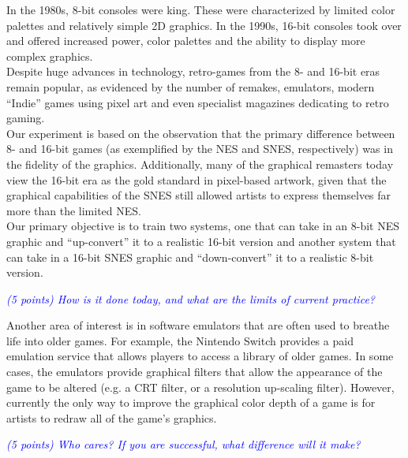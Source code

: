 \documentclass[10pt,twocolumn,letterpaper]{article}
\begin{document}
In the 1980s, 8-bit consoles were king. These were characterized by limited color palettes and relatively simple 2D graphics. In the 1990s, 16-bit consoles took over and offered increased power, color palettes and the ability to display more complex graphics.\\
Despite huge advances in technology, retro-games from the 8- and 16-bit eras remain popular, as evidenced by the number of remakes, emulators, modern ``Indie'' games using pixel art and even specialist magazines dedicating to retro gaming.\\
Our experiment is based on the observation that the primary difference between 8- and 16-bit games (as exemplified by the NES and SNES, respectively) was in the fidelity of the graphics. Additionally, many of the graphical remasters today view the 16-bit era as the gold standard in pixel-based artwork, given that the graphical capabilities of the SNES still allowed artists to express themselves far more than the limited NES.\\
Our primary objective is to train two systems, one that can take in an 8-bit NES graphic and ``up-convert'' it to a realistic 16-bit version and another system that can take in a 16-bit SNES graphic and ``down-convert'' it to a realistic 8-bit version.

\textit{\textcolor{blue}{(5 points) How is it done today, and what are the limits of current practice?}}

Another area of interest is in software emulators that are often used to breathe life into older games. For example, the Nintendo Switch provides a paid emulation service that allows players to access a library of older games. In some cases, the emulators provide graphical filters that allow the appearance of the game to be altered (e.g. a CRT filter, or a resolution up-scaling filter). However, currently the only way to improve the graphical color depth of a game is for artists to redraw all of the game's graphics.

\textit{\textcolor{blue}{(5 points) Who cares? If you are successful, what difference will it make?}}
\end{document}
